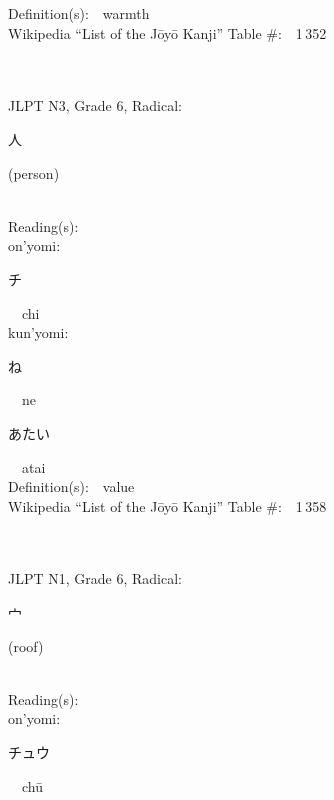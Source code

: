 \begin{multicols}{2}
Definition(s):\ \ warmth \\
Wikipedia ``List of the J\=oy\=o Kanji'' Table \#:\ \ 1\,352 \\
\ \ \\
{\fontsize{34pt}{40pt}  }\ \ \\  %
{JLPT N3, Grade 6, Radical:\ \ {\begin{CJK}{UTF8}{min} 人 \end{CJK}} (person) } \\
Reading(s):\ \ \\
{\hspace*{1em}}on'yomi:\ \ \\
{\hspace*{2em}}{\begin{CJK}{UTF8}{min} チ \end{CJK}}\ \ chi\ \ \\
{\hspace*{1em}}kun'yomi:\ \ \\
{\hspace*{2em}}{\begin{CJK}{UTF8}{min} ね \end{CJK}}\ \ ne\ \ \\
{\hspace*{2em}}{\begin{CJK}{UTF8}{min} あたい \end{CJK}}\ \ atai\ \ \\
Definition(s):\ \ value \\
Wikipedia ``List of the J\=oy\=o Kanji'' Table \#:\ \ 1\,358 \\
\ \ \\
{\fontsize{34pt}{40pt}  }\ \ \\  %
{JLPT N1, Grade 6, Radical:\ \ {\begin{CJK}{UTF8}{min} 宀 \end{CJK}} (roof) } \\
Reading(s):\ \ \\
{\hspace*{1em}}on'yomi:\ \ \\
{\hspace*{2em}}{\begin{CJK}{UTF8}{min} チュウ \end{CJK}}\ \ ch\=u\ \ \\

\end{multicols}
